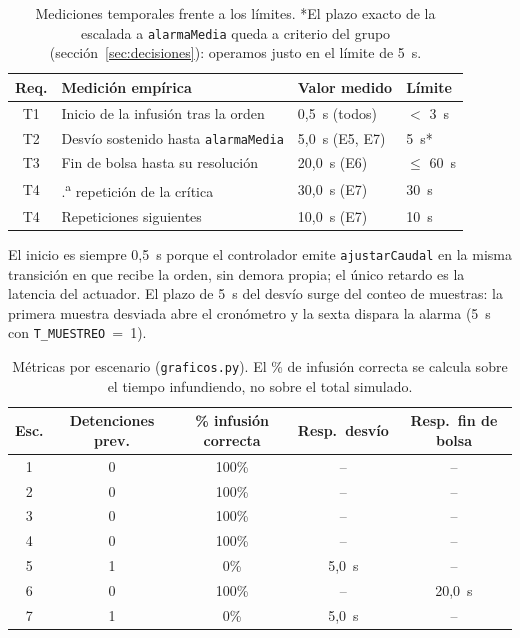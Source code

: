 \documentclass[11pt,a4paper]{article}
\begin{document}
\begin{table}[H]
\centering
\small
\renewcommand{\arraystretch}{1.2}
\begin{tabular}{c >{\raggedright\arraybackslash}p{6.6cm} l l}
\toprule
Req. & Medición empírica & Valor medido & Límite \\
\midrule
T1 & Inicio de la infusión tras la orden & 0,5~s (todos) & $<$ 3~s \\
T2 & Desvío sostenido hasta \texttt{alarmaMedia} & 5,0~s (E5, E7) & 5~s* \\
T3 & Fin de bolsa hasta su resolución & 20,0~s (E6) & $\le$ 60~s \\
T4 & 1.\textsuperscript{a} repetición de la crítica & 30,0~s (E7) & 30~s \\
T4 & Repeticiones siguientes & 10,0~s (E7) & 10~s \\
\bottomrule
\end{tabular}
\caption{Mediciones temporales frente a los límites. *El plazo exacto de la escalada a \texttt{alarmaMedia} queda a criterio del grupo (sección~\ref{sec:decisiones}): operamos justo en el límite de 5~s.}
\label{tab:tiempos}
\end{table}

\noindent El inicio es siempre 0,5~s porque el controlador emite \texttt{ajustarCaudal} en la misma transición en que recibe la orden, sin demora propia; el único retardo es la latencia del actuador. El plazo de 5~s del desvío surge del conteo de muestras: la primera muestra desviada abre el cronómetro y la sexta dispara la alarma (5~s con \texttt{T\_MUESTREO}~=~1).

\begin{table}[H]
\centering
\small
\renewcommand{\arraystretch}{1.2}
\begin{tabular}{c c c c c}
\toprule
Esc. & Detenciones prev. & \% infusión correcta & Resp.\ desvío & Resp.\ fin de bolsa \\
\midrule
1 & 0 & 100\% & --     & --      \\
2 & 0 & 100\% & --     & --      \\
3 & 0 & 100\% & --     & --      \\
4 & 0 & 100\% & --     & --      \\
5 & 1 & 0\%   & 5,0~s  & --      \\
6 & 0 & 100\% & --     & 20,0~s  \\
7 & 1 & 0\%   & 5,0~s  & --      \\
\bottomrule
\end{tabular}
\caption{Métricas por escenario (\texttt{graficos.py}). El \% de infusión correcta se calcula sobre el tiempo infundiendo, no sobre el total simulado.}
\label{tab:metricas}
\end{table}
\end{document}
